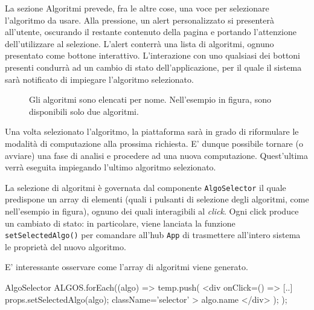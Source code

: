 La sezione Algoritmi prevede, fra le altre cose, una voce per selezionare l'algoritmo da usare. Alla pressione, un alert personalizzato si presenterà all'utente, oscurando il restante contenuto della pagina e portando l'attenzione dell'utilizzare al selezione. L'alert conterrà una lista di algoritmi, ognuno presentato come bottone interattivo. L'interazione con uno qualsiasi dei bottoni presenti condurrà ad un cambio di stato dell'applicazione, per il quale il sistema sarà notificato di impiegare l'algoritmo selezionato.

\begin{figure}[ht!]
    \centering
    \caption{Gli algoritmi sono elencati per nome. Nell'esempio in figura, sono disponibili solo due algoritmi.}
    \label{fig:esempio}
\end{figure}

Una volta selezionato l'algoritmo, la piattaforma sarà in grado di riformulare le modalità di computazione alla prossima richiesta. E' dunque possibile tornare (o avviare) una fase di analisi e procedere ad una nuova computazione. Quest'ultima verrà eseguita impiegando l'ultimo algoritmo selezionato.

\vspace{3mm}

La selezione di algoritmi è governata dal componente \verb|AlgoSelector| il quale predispone un array di elementi (quali i pulsanti di selezione degli algoritmi, come nell'esempio in figura), ognuno dei quali interagibili al \textit{click}. Ogni click produce un cambiato di stato: in particolare, viene lanciata la funzione \verb|setSelectedAlgo()| per comandare all'hub \verb|App| di trasmettere all'intero sistema le proprietà del nuovo algoritmo.

E' interessante osservare come l'array di algoritmi viene generato. 

\begin{sexylisting}{AlgoSelector}
ALGOS.forEach((algo) => {
  temp.push(
    <div
      onClick={() => {
		[..] props.setSelectedAlgo(algo);
	  }}
	  className='selector'
	>
	  {algo.name}
    </div>
  );
});
\end{sexylisting}

